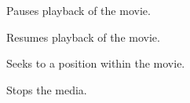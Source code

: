 \label{wxmediactrlpause}


Pauses playback of the movie.


\label{wxmediactrlplay}


Resumes playback of the movie.


\label{wxmediactrlsetposition}


Seeks to a position within the movie.


\label{wxmediactrlstop}


Stops the media.

